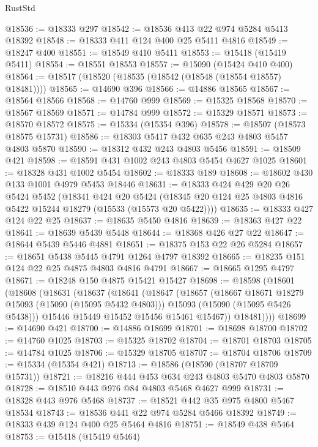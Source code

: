 \begin{lexlean}{RustStd}
\begin{coremodule}
@18536 := @18333 @297
@18542 := @18536 @413 @22 @974 @5284 @5413 @18392
@18548 := @18333 @411 @124 @400 @25 @5411 @4816
@18549 := @18247 @400
@18551 := @18549 @410 @5411
@18553 := @15418 (@15419 @5411)
@18554 := @18551 @18553
@18557 := @15090 (@15424 @410 @400)
@18564 := @18517 (@18520 (@18535 (@18542 (@18548 (@18554 @18557) @18481))))
@18565 := @14690 @396
@18566 := @14886 @18565
@18567 := @18564 @18566
@18568 := @14760 @999
@18569 := @15325 @18568
@18570 := @18567 @18569
@18571 := @14784 @999
@18572 := @15329 @18571
@18573 := @18570 @18572
@18575 := @15334 (@15354 @396)
@18578 := @18507 (@18573 @18575 @15731)
@18586 := @18303 @5417 @432 @635 @243 @4803 @5457 @4803 @5870
@18590 := @18312 @432 @243 @4803 @5456
@18591 := @18509 @421
@18598 := @18591 @431 @1002 @243 @4803 @5454 @4627 @1025
@18601 := @18328 @431 @1002 @5454
@18602 := @18333 @189
@18608 := @18602 @430 @133 @1001 @4979 @5453 @18446
@18631 := @18333
    @424
    @429
    @20
    @26
    @5424
    @5452
    (@18341
      @424
      @20
      @5424
      (@18345 @20 @124 @25 @4803 @4816 @5422 @15244 @18279 (@15533 (@15573 @20 @5422))))
@18635 := @18333 @427 @124 @22 @25
@18637 := @18635 @5450 @4816
@18639 := @18363 @427 @22
@18641 := @18639 @5439 @5448
@18644 := @18368 @426 @27 @22
@18647 := @18644 @5439 @5446 @4881
@18651 := @18375 @153 @22 @26 @5284
@18657 := @18651 @5438 @5445 @4791 @1264 @4797 @18392
@18665 := @18235 @151 @124 @22 @25 @4875 @4803 @4816 @4791
@18667 := @18665 @1295 @4797
@18671 := @18248 @150 @4875 @15421 @15427
@18698 := @18598
    (@18601
      (@18608
        (@18631
          (@18637
            (@18641
              (@18647
                (@18657
                  (@18667 @18671 @18279 @15093 (@15090 (@15095 @5432 @4803)))
                  @15093
                  (@15090 (@15095 @5426 @5438)))
                @15446
                @15449
                @15452
                @15456
                @15461
                @15467))
            @18481))))
@18699 := @14690 @421
@18700 := @14886 @18699
@18701 := @18698 @18700
@18702 := @14760 @1025
@18703 := @15325 @18702
@18704 := @18701 @18703
@18705 := @14784 @1025
@18706 := @15329 @18705
@18707 := @18704 @18706
@18709 := @15334 (@15354 @421)
@18713 := @18586 (@18590 (@18707 @18709 @15731))
@18721 := @18216 @444 @453 @634 @243 @4803 @5470 @4803 @5870
@18728 := @18510 @443 @976 @84 @4803 @5468 @4627 @999
@18731 := @18328 @443 @976 @5468
@18737 := @18521 @442 @35 @975 @4800 @5467 @18534
@18743 := @18536 @441 @22 @974 @5284 @5466 @18392
@18749 := @18333 @439 @124 @400 @25 @5464 @4816
@18751 := @18549 @438 @5464
@18753 := @15418 (@15419 @5464)

\end{coremodule}
\end{lexlean}

